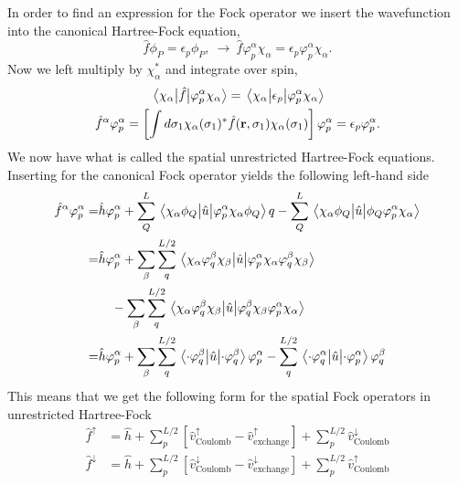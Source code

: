 In order to find an expression for the Fock operator we insert the wavefunction into the 
canonical Hartree-Fock equation,
\begin{equation}
    \hat{f}\phi_P = \epsilon_p\phi_P, \ \to \ 
    \hat{f}\varphi_p^\alpha \chi_\alpha = \epsilon_p\varphi_p^\alpha \chi_\alpha. 
\end{equation}
Now we left multiply by $\chi_\alpha^*$ and integrate over spin,
\begin{gather}
    \mel{\chi_\alpha}{\hat{f}}{\varphi_p^\alpha\chi_\alpha}
    = \mel{\chi_\alpha}{\epsilon_p}{\varphi_p^\alpha\chi_\alpha} \\
    \hat{f}^\alpha \varphi_p^\alpha
    = \left[ 
        \int d\sigma_1 \chi_\alpha(\sigma_1)^*\hat{f}(\vb{r}, \sigma_1)\chi_\alpha(\sigma_1)     
    \right] \varphi_p^\alpha
    = \epsilon_p\varphi_p^\alpha.
\end{gather}
We now have what is called the spatial unrestricted Hartree-Fock equations. Inserting for 
the canonical Fock operator yields the following left-hand side
\begin{equation}
    \begin{aligned}
        \hat{f}^\alpha\varphi_p^\alpha 
        =& \hat{h}\varphi_p^\alpha 
        + \sum_Q^L \mel{\chi_\alpha \phi_Q}{\hat{u}}{\varphi_p^\alpha\chi_\alpha\phi_Q}q
        - \sum_Q^L \mel{\chi_\alpha \phi_Q}{\hat{u}}{\phi_Q\varphi_p^\alpha\chi_\alpha} \\
        =& \hat{h}\varphi_p^\alpha
        + \sum_\beta \sum_q^{L/2}
            \mel{\chi_\alpha\varphi^\beta_q\chi_\beta}{\hat{u}}{\varphi^\alpha_p\chi_\alpha\varphi^\beta_q\chi_\beta} \\
        & \quad - \sum_\beta \sum_q^{L/2}
            \mel{\chi_\alpha\varphi^\beta_q\chi_\beta}{\hat{u}}{\varphi^\beta_q\chi_\beta\varphi^\alpha_p\chi_\alpha} \\
        =& \hat{h} \varphi_p^\alpha
        + \sum_\beta \sum_q^{L/2}
            \mel{\cdot\varphi_q^\beta}{\hat{u}}{\cdot\varphi_q^\beta}\varphi_p^\alpha
        - \sum_q^{L/2}
            \mel{\cdot\varphi_q^\alpha}{\hat{u}}{\cdot\varphi_p^\alpha}\varphi_q^\beta
    \end{aligned}
\end{equation} 
This means that we get the following form for the spatial Fock operators in unrestricted Hartree-Fock 
\begin{align}
\label{eq:fock_up_uhf}
\hat{f}^\uparrow &= 
    \hat{h} + \sum_p^{L/2}[\hat{v}^\uparrow_{\text{Coulomb}} - \hat{v}^\uparrow_{\text{exchange}}]
    + \sum_p^{L/2}\hat{v}^\downarrow_{\text{Coulomb}}  \\
\label{eq:fock_down_uhf}
\hat{f}^\downarrow &= 
    \hat{h} + \sum_p^{L/2}[\hat{v}^\downarrow_{\text{Coulomb}} - \hat{v}^\downarrow_{\text{exchange}}]
    + \sum_p^{L/2}\hat{v}^\uparrow_{\text{Coulomb}}
\end{align}
